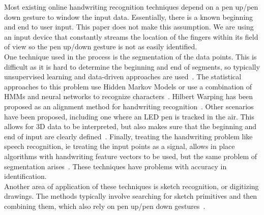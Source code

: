 Most existing online handwriting recognition techniques depend on a pen up/pen down gesture to window the input data. Essentially, there is a known beginning and end to user input. This paper does not make this assumption. We are using an input device that constantly streams the location of the fingers within its field of view so the pen up/down gesture is not as easily identified. \\[1\baselineskip]
One technique used in the process is the segmentation of the data points. This is difficult as it is hard to determine the beginning and end of segments, so typically unsupervised learning and data-driven approaches are used~\cite{plamondon2000online}. The statistical approaches to this problem use Hidden Markov Models or use a combination of HMMs and neural networks to recognize characters~\cite{plotz2009markov}. Hilbert Warping has been proposed as an alignment method for handwriting recognition~\cite{ishida2010hilbert}. Other scenarios have been proposed, including one where an LED pen is tracked in the air. This allows for 3D data to be interpreted, but also makes sure that the beginning and end of input are clearly defined~\cite{asano2010visual}. Finally, treating the handwriting problem like speech recognition, ie treating the input points as a signal, allows in place algorithms with handwriting feature vectors to be used, but the same problem of segmentation arises~\cite{starner1994online}. These techniques have problems with accuracy in identification. \\[1\baselineskip]
Another area of application of these techniques is sketch recognition, or digitizing drawings. The methods typically involve searching for sketch primitives and then combining them, which also rely on pen up/pen down gestures~\cite{hammond2011recognizing}. 
